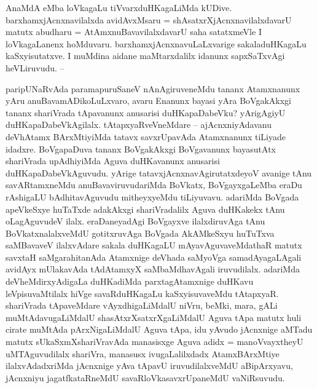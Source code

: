 \begin{artha} %
  AnaMdA eMba loVkagaLu tiVvarxduHKagaLiMda kUDive. barxhamxjAcnxnavilalxda avidAvxMsaru = shAsatxrXjAcnxnavilalxdavarU matutx abudharu = AtAmxnuBavavilalxdavarU saha satatxmeVle I loVkagaLanenx hoMduvaru. barxhamxjAcnxnavuLaLxvarige sakaladuHKagaLu kaSxyisutatxve. I muMdina aidane maMtarxdalilx idanunx sapxSaTxvAgi heVLiruvudu. --
\end{artha}

\begin{artha} %
  paripUNaRvAda paramapuruSaneV nAnAgiruveneMdu tananx Atamxnanunx yAru anuBavamADikoLuLxvaro, avaru Enanunx bayasi yAra BoVgakAkxgi tananx shariVrada tApavanunx anusarisi duHKapaDabeVku? yArigAgiyU duHKapaDabeVkAgilalx. tAtapxyaRveVneMdare -- ajAcnxniyAdavanu deVhAtamx BArxMtiyiMda tatavx savxrUpavAda Atamxnanunx tiLiyade idadxre. BoVgapaDuva tananx BoVgakAkxgi BoVgavanunx bayasutAtx shariVrada upAdhiyiMda Aguva duHKavanunx anusarisi duHKapaDabeVkAguvudu. yArige tatavxjAcnxnavAgirutatxdeyoV avanige tAnu savARtamxneMdu anuBavaviruvudariMda BoVkatx, BoVgayxgaLeMba eraDu rAshigaLU bAdhitavAguvudu mitheyxyeMdu tiLiyuvavu. adariMda BoVgada apeVkeSxye huTaTxde adakAkxgi shariVradalilx Aguva duHKakekx tAnu oLagAguvudeV ilalx. eraDaneyadAgi BoVgayxve ilalxdiruvAga tAnu BoVkatxnalalxveMdU gotitxruvAga BoVgada AkAMkeSxyu huTuTxva saMBavaveV ilalxvAdare sakala duHKagaLU mAyavAguvaveMdathaR matutx savxtaH saMgarahitanAda Atamxnige deVhada saMyoVga samadAyagaLAgali avidAyx mUlakavAda tAdAtamxyX saMbaMdhavAgali iruvudilalx. adariMda deVheMdirxyAdigaLa duHKadiMda parxtagAtamxnige duHKavu leVpisuvaMtilalx hiVge savaRduHKagaLu kaSxyisuvaveMdu tAtapxyaR. shariVrada tApaveMdare vAyxdhigaLiMdalU niVru, beMki, mara, gALi muMtAdavugaLiMdalU shasAtxrXsatxrXgaLiMdalU Aguva tApa matutx huli cirate muMtAda pArxNigaLiMdalU Aguva tApa, idu yAvudo jAcnxnige aMTadu matutx sUkaSxmXshariVravAda manasisxge Aguva adidx = manoVvayxtheyU uMTAguvudilalx shariVra, manasusx ivugaLalilxdadx AtamxBArxMtiye ilalxvAdadxriMda jAcnxnige yAva tApavU iruvudilalxveMdU aBipArxyavu, jAcnxniyu jagatfkataRneMdU savaRloVkasavxrUpaneMdU vaNiRsuvudu. 
\end{artha}


